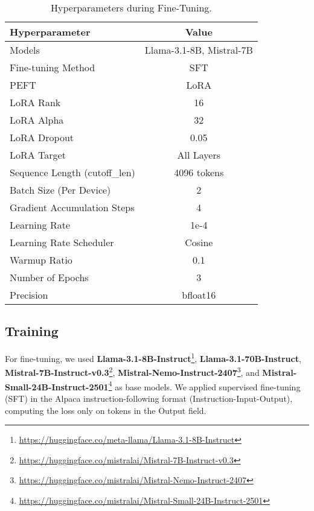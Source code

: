 \begin{table}[h!]
\centering
\small
\begin{tabular}{lc}
\toprule
\textbf{Hyperparameter} & \textbf{Value} \\ \midrule
Models & Llama-3.1-8B, Mistral-7B \\ 
Fine-tuning Method & SFT \\
PEFT & LoRA \\
LoRA Rank & 16 \\
LoRA Alpha & 32 \\
LoRA Dropout & 0.05 \\
LoRA Target & All Layers \\
Sequence Length (cutoff\_len) & 4096 tokens \\
Batch Size (Per Device) & 2 \\
Gradient Accumulation Steps & 4 \\
Learning Rate & 1e-4 \\
Learning Rate Scheduler & Cosine \\
Warmup Ratio & 0.1 \\
Number of Epochs & 3 \\
Precision & bfloat16 \\ \bottomrule
\end{tabular}
\caption{Hyperparameters during Fine-Tuning.}
\label{tab:hyperparams}
\end{table}

\subsection{Training}
\label{apdx:training}
For fine-tuning, we used \textbf{Llama-3.1-8B-Instruct}\footnote{\url{https://huggingface.co/meta-llama/Llama-3.1-8B-Instruct}}, \textbf{Llama-3.1-70B-Instruct}, \textbf{Mistral-7B-Instruct-v0.3}\footnote{\url{https://huggingface.co/mistralai/Mistral-7B-Instruct-v0.3}}, \textbf{Mistral-Nemo-Instruct-2407}\footnote{\url{https://huggingface.co/mistralai/Mistral-Nemo-Instruct-2407}}, and \textbf{Mistral-Small-24B-Instruct-2501}\footnote{\url{https://huggingface.co/mistralai/Mistral-Small-24B-Instruct-2501}} as base models. We applied supervised fine-tuning (SFT) in the Alpaca instruction-following format (Instruction-Input-Output), computing the loss only on tokens in the Output field.

